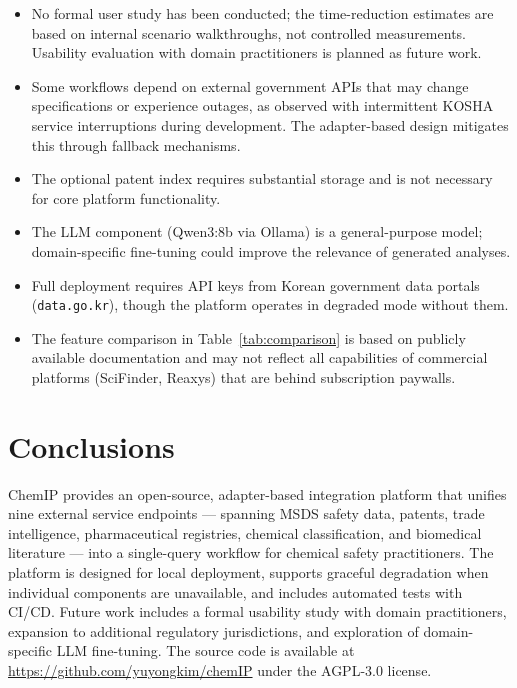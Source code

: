 \documentclass[preprint,12pt]{elsarticle}
\begin{document}
\begin{itemize}
\item No formal user study has been conducted; the time-reduction estimates are based on internal scenario walkthroughs, not controlled measurements. Usability evaluation with domain practitioners is planned as future work.
\item Some workflows depend on external government APIs that may change specifications or experience outages, as observed with intermittent KOSHA service interruptions during development. The adapter-based design mitigates this through fallback mechanisms.
\item The optional patent index requires substantial storage and is not necessary for core platform functionality.
\item The LLM component (Qwen3:8b via Ollama) is a general-purpose model; domain-specific fine-tuning could improve the relevance of generated analyses.
\item Full deployment requires API keys from Korean government data portals (\texttt{data.go.kr}), though the platform operates in degraded mode without them.
\item The feature comparison in Table~\ref{tab:comparison} is based on publicly available documentation and may not reflect all capabilities of commercial platforms (SciFinder, Reaxys) that are behind subscription paywalls.
\end{itemize}


\section{Conclusions}

ChemIP provides an open-source, adapter-based integration platform that unifies nine external service endpoints --- spanning MSDS safety data, patents, trade intelligence, pharmaceutical registries, chemical classification, and biomedical literature --- into a single-query workflow for chemical safety practitioners. The platform is designed for local deployment, supports graceful degradation when individual components are unavailable, and includes automated tests with CI/CD. Future work includes a formal usability study with domain practitioners, expansion to additional regulatory jurisdictions, and exploration of domain-specific LLM fine-tuning. The source code is available at \url{https://github.com/yuyongkim/chemIP} under the AGPL-3.0 license.
\end{document}
